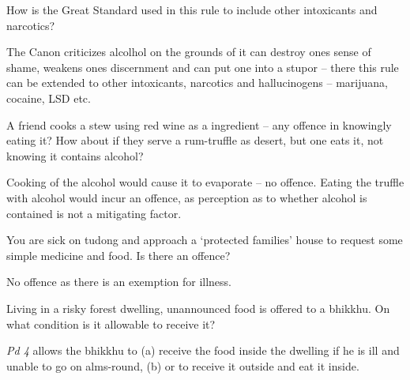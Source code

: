 \bigskip

How is the Great Standard used in this rule to include other intoxicants and narcotics?

\begin{solution}
  The Canon criticizes alcolhol on the grounds of it can destroy ones sense of
  shame, weakens ones discernment and can put one into a stupor – there this
  rule can be extended to other intoxicants, narcotics and hallucinogens –
  marijuana, cocaine, LSD etc.
\end{solution}

\bigskip

A friend cooks a stew using red wine as a ingredient – any offence in knowingly
eating it? How about if they serve a rum-truffle as desert, but one eats it, not
knowing it contains alcohol?

\begin{solution}
  Cooking of the alcohol would cause it to evaporate -- no offence. Eating the
  truffle with alcohol would incur an offence, as perception as to whether
  alcohol is contained is not a mitigating factor.
\end{solution}

\bigskip


You are sick on tudong and approach a ‘protected families’ house to request some
simple medicine and food. Is there an offence?

\bigskip

\begin{solution}
  No offence as there is an exemption for illness.
\end{solution}


Living in a risky forest dwelling, unannounced food is offered to a bhikkhu.
On what condition is it allowable to receive it?

\begin{solution}
  \emph{Pd 4} allows the bhikkhu to
  (a) receive the food inside the dwelling if he is ill and unable to go on alms-round,
  (b) or to receive it outside and eat it inside.
\end{solution}

